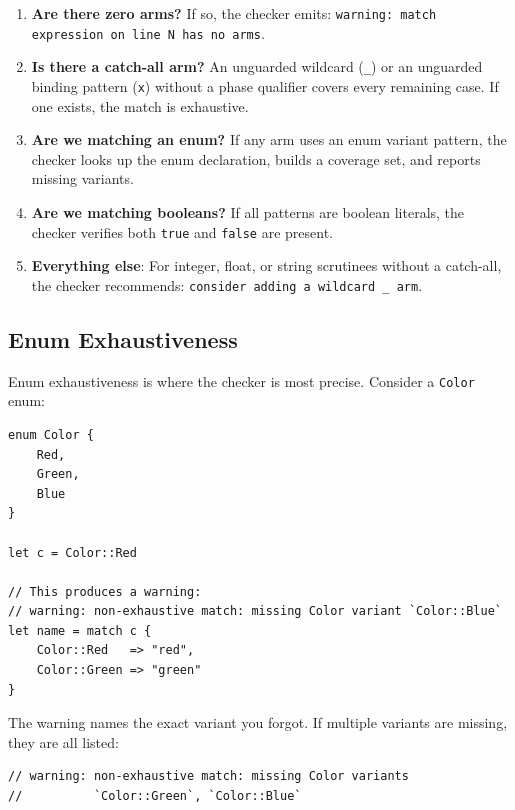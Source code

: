 \begin{enumerate}
  \item \textbf{Are there zero arms?} If so, the checker emits: \texttt{warning: match expression on line N has no arms}.
  \item \textbf{Is there a catch-all arm?} An unguarded wildcard (\lstinline|_|) or an unguarded binding pattern (\lstinline|x|) without a phase qualifier covers every remaining case. If one exists, the match is exhaustive.
  \item \textbf{Are we matching an enum?} If any arm uses an enum variant pattern, the checker looks up the enum declaration, builds a coverage set, and reports missing variants.
  \item \textbf{Are we matching booleans?} If all patterns are boolean literals, the checker verifies both \lstinline|true| and \lstinline|false| are present.
  \item \textbf{Everything else}: For integer, float, or string scrutinees without a catch-all, the checker recommends: \texttt{consider adding a wildcard \_ arm}.
\end{enumerate}

\subsection{Enum Exhaustiveness}\label{sec:enum-exhaustiveness}

Enum exhaustiveness is where the checker is most precise. Consider a \lstinline|Color| enum:

\begin{lstlisting}[language=Lattice, caption={The checker catches missing variants}]
enum Color {
    Red,
    Green,
    Blue
}

let c = Color::Red

// This produces a warning:
// warning: non-exhaustive match: missing Color variant `Color::Blue`
let name = match c {
    Color::Red   => "red",
    Color::Green => "green"
}
\end{lstlisting}

The warning names the exact variant you forgot. If multiple variants are missing, they are all listed:

\begin{lstlisting}[language=Lattice, numbers=none]
// warning: non-exhaustive match: missing Color variants
//          `Color::Green`, `Color::Blue`
\end{lstlisting}

